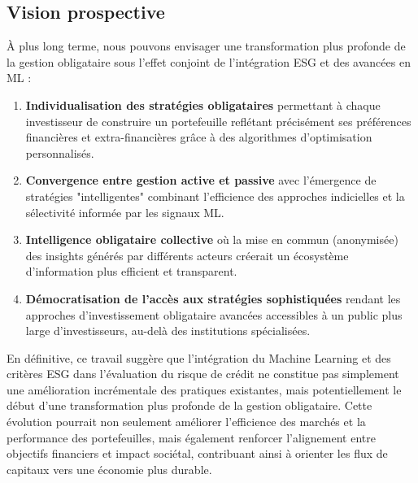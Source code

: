 \subsection*{Vision prospective}

À plus long terme, nous pouvons envisager une transformation plus profonde de la gestion obligataire sous l'effet conjoint de l'intégration ESG et des avancées en ML :

\begin{enumerate}
  \item \textbf{Individualisation des stratégies obligataires} permettant à chaque investisseur de construire un portefeuille reflétant précisément ses préférences financières et extra-financières grâce à des algorithmes d'optimisation personnalisés.

  \item \textbf{Convergence entre gestion active et passive} avec l'émergence de stratégies "intelligentes" combinant l'efficience des approches indicielles et la sélectivité informée par les signaux ML.

  \item \textbf{Intelligence obligataire collective} où la mise en commun (anonymisée) des insights générés par différents acteurs créerait un écosystème d'information plus efficient et transparent.

  \item \textbf{Démocratisation de l'accès aux stratégies sophistiquées} rendant les approches d'investissement obligataire avancées accessibles à un public plus large d'investisseurs, au-delà des institutions spécialisées.
\end{enumerate}

En définitive, ce travail suggère que l'intégration du Machine Learning et des critères ESG dans l'évaluation du risque de crédit ne constitue pas simplement une amélioration incrémentale des pratiques existantes, mais potentiellement le début d'une transformation plus profonde de la gestion obligataire. Cette évolution pourrait non seulement améliorer l'efficience des marchés et la performance des portefeuilles, mais également renforcer l'alignement entre objectifs financiers et impact sociétal, contribuant ainsi à orienter les flux de capitaux vers une économie plus durable.